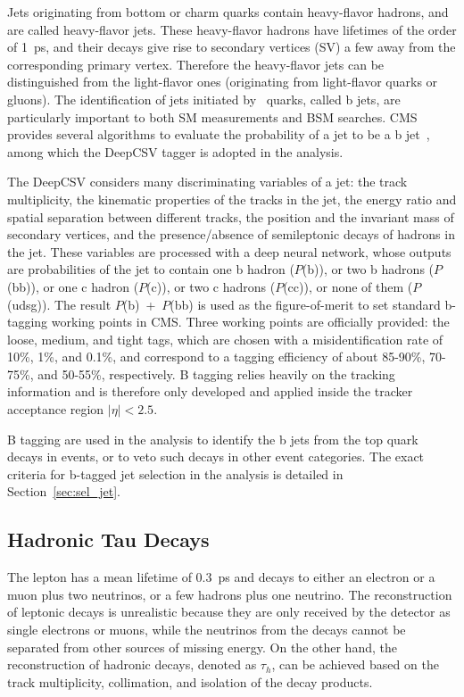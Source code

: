 Jets originating from bottom or charm quarks contain heavy-flavor hadrons, and are called heavy-flavor jets.
These heavy-flavor hadrons have lifetimes of the order of 1~ps, and their decays give rise to secondary vertices (SV) a few \mm away from the corresponding primary vertex. 
Therefore the heavy-flavor jets can be distinguished from the light-flavor ones (originating from light-flavor quarks or gluons).
The identification of jets initiated by \Pqb~quarks, called b jets, are particularly important to both SM measurements and BSM searches.
CMS provides several algorithms to evaluate the probability of a jet to be a b jet~\cite{Sirunyan:2017ezt}, among which the DeepCSV tagger is adopted in the \hmm analysis.

The DeepCSV considers many discriminating variables of a jet: the track multiplicity, the kinematic properties of the tracks in the jet,
the energy ratio and spatial separation between different tracks, the position and the invariant mass of secondary vertices, 
and the presence/absence of semileptonic decays of hadrons in the jet.
These variables are processed with a deep neural network, whose outputs are probabilities of the jet to contain one b hadron ($P$(b)), or two b hadrons ($P$(bb)),
or one c hadron ($P$(c)), or two c hadrons ($P$(cc)), or none of them ($P$(udsg)).  
The result $P$(b)~+~$P$(bb) is used as the figure-of-merit to set standard b-tagging working points in CMS.
Three working points are officially provided: the loose, medium, and tight tags, 
which are chosen with a misidentification rate of 10\%, 1\%, and 0.1\%, 
and correspond to a tagging efficiency of about 85-90\%, 70-75\%, and 50-55\%, respectively.
B tagging relies heavily on the tracking information and is therefore only developed and applied inside the tracker acceptance region $|\eta| < 2.5$.

B tagging are used in the \hmm analysis to identify the b jets from the top quark decays in \ttH events, 
or to veto such decays in other event categories.
The exact criteria for b-tagged jet selection in the \hmm analysis is detailed in Section~\ref{sec:sel_jet}.

\subsection{Hadronic Tau Decays}\label{sec:reco_tau}

The \tau{} lepton has a mean lifetime of 0.3~ps and decays to either an electron or a muon plus two neutrinos, or a few hadrons plus one neutrino.
The reconstruction of leptonic \tau{} decays is unrealistic because they are only received by the detector as single electrons or muons, 
while the neutrinos from the decays cannot be separated from other sources of missing energy.
On the other hand, the reconstruction of hadronic \tau{} decays, denoted as $\tau_{h}$, can be achieved based on the track multiplicity, collimation, and isolation of the decay products.  

